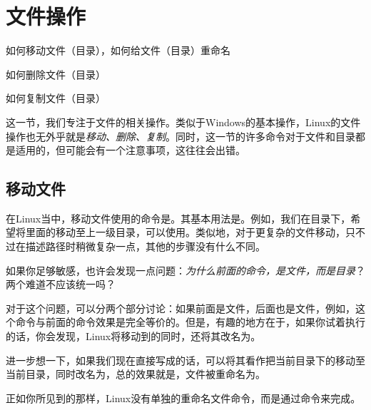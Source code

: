 \section{文件操作}\label{sec:文件操作}

\begin{Abstract}
    \item 如何移动文件（目录），如何给文件（目录）重命名
    \item 如何删除文件（目录）
    \item 如何复制文件（目录）
\end{Abstract}


这一节，我们专注于文件的相关操作。类似于Windows的基本操作，Linux的文件操作也无外乎就是\emph{移动、删除、复制}。同时，这一节的许多命令对于文件和目录都是适用的，但可能会有一个注意事项，这往往会出错。

\subsection{移动文件}\label{subsec:文件操作-移动文件}

在Linux当中，移动文件使用的命令是。其基本用法是。例如，我们在目录下，希望将里面的移动至上一级目录，可以使用。类似地，对于更复杂的文件移动，只不过在描述路径时稍微复杂一点，其他的步骤没有什么不同。

如果你足够敏感，也许会发现一点问题：\emph{为什么前面的命令，是文件，而是目录}？两个难道不应该统一吗？

对于这个问题，可以分两个部分讨论：如果前面是文件，后面也是文件，例如，这个命令与前面的命令效果是完全等价的。但是，有趣的地方在于，如果你试着执行的话，你会发现，Linux将移动到的同时，还将其改名为。

进一步想一下，如果我们现在直接写成的话，可以将其看作把当前目录下的移动至当前目录，同时改名为，总的效果就是，文件被重命名为。

\begin{attention}
    正如你所见到的那样，Linux没有单独的重命名文件命令，而是通过命令来完成。
\end{attention}


